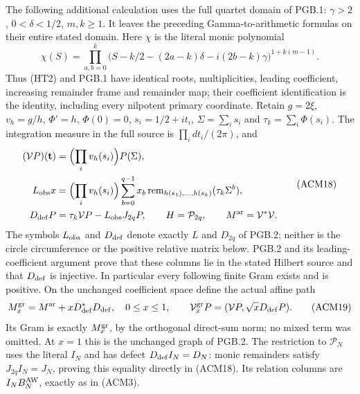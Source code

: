 The following additional calculation uses the full quartet domain of
PGB.1: $\gamma>2$, $0<\delta<1/2$, $m,k\geq1$.
It leaves the preceding Gamma-to-arithmetic formulas on their entire
stated domain. Here $\chi$ is the literal monic polynomial
\[
 \chi(S)=\prod_{a,b=0}^{k}
 \bigl(S-k/2-(2a-k)\delta-i(2b-k)\gamma\bigr)^{1+k(m-1)}.
 \tag{ACM17}
\]
Thus (HT2) and PGB.1 have identical roots, multiplicities, leading
coefficient, increasing remainder frame and remainder map; their
coefficient identification is the identity, including every nilpotent
primary coordinate. Retain $g=2\xi$, $v_h=g/h$, $\Phi'=h$,
$\Phi(0)=0$, $s_i=1/2+it_i$, $\Sigma=\sum_i s_i$ and
$\tau_k=\sum_i\Phi(s_i)$. The integration measure in the full
source is $\prod_i dt_i/(2\pi)$, and
\[
 \begin{aligned}
 (\mathcal VP)(\mathbf t)&=\Bigl(\prod_i v_h(s_i)\Bigr)P(\Sigma),\\
 L_{\rm obs}x&=\Bigl(\prod_i v_h(s_i)\Bigr)
  \sum_{b=0}^{q-1}x_b\operatorname{rem}_{h(s_1),\ldots,h(s_k)}
                                      (\tau_k\Sigma^b),\\
 D_{\rm def}P&=\tau_k\mathcal VP-L_{\rm obs}J_{2q}P,
 \qquad H=\mathcal P_{2q},\qquad M^{\rm ar}=\mathcal V^*\mathcal V.
 \end{aligned}
 \tag{ACM18}
\]
The symbols $L_{\rm obs}$ and $D_{\rm def}$ denote exactly $L$ and
$D_{2q}$ of PGB.2; neither is the circle circumference or the
positive relative matrix below. PGB.2 and its leading-coefficient
argument prove that these columns lie in the stated Hilbert source
and that $D_{\rm def}$ is injective. In particular every following
finite Gram exists and is positive. On the unchanged coefficient
space define the actual affine path
\[
 M_x^{\rm gr}=M^{\rm ar}+xD_{\rm def}^*D_{\rm def},\quad
 0\leq x\leq1,\qquad
 \mathcal V_x^{\rm gr}P=(\mathcal VP,\sqrt{x}D_{\rm def}P).
 \tag{ACM19}
\]
Its Gram is exactly $M_x^{\rm gr}$, by the orthogonal direct-sum
norm; no mixed term was omitted. At $x=1$ this is the unchanged
graph of PGB.2. The restriction to $\mathcal P_N$ uses the literal
$I_N$ and has defect $D_{\rm def}I_N=D_N$: monic remainders
satisfy $J_{2q}I_N=J_N$, proving this equality directly in (ACM18).
Its relation columns are $I_NB_N^{\rm AW}$, exactly as in (ACM3).

